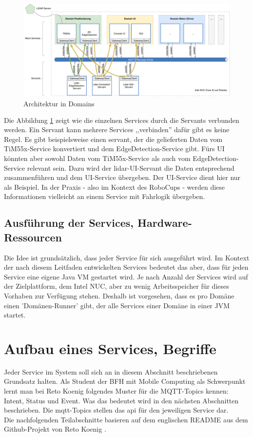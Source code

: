 \begin{figure}[H]
	\centering
	\includegraphics[width=\textwidth]{img/architecture-highlevel.pdf}
	\caption{Architektur in Domains}
	\label{fig:architecture_highlevel}
\end{figure}

Die Abbildung \ref{fig:architecture_highlevel} zeigt wie die einzelnen Services durch die Servants verbunden werden. Ein Servant kann mehrere Services ,,verbinden'' dafür gibt es keine Regel. Es gibt beispielsweise einen \Gls{servant}, der die gelieferten Daten vom TiM55x-Service konvertiert und dem EdgeDetection-Service gibt. Fürs UI könnten aber sowohl Daten vom TiM55x-Service als auch vom EdgeDetection-Service relevant sein. Dazu wird der \acrshort{lidar}-UI-Servant die Daten entsprechend zusammenführen und dem UI-Service übergeben. Der UI-Service dient hier nur als Beispiel. In der Praxis - also im Kontext des RoboCups - werden diese Informationen vielleicht an einem Service mit Fahrlogik übergeben.

\subsection{Ausführung der Services, Hardware-Ressourcen}
Die Idee ist grundsätzlich, dass jeder Service für sich ausgeführt wird. Im Kontext der nach diesem Leitfaden entwickelten Services bedeutet das aber, dass für jeden Service eine eigene Java VM gestartet wird. Je nach Anzahl der Services wird auf der Zielplattform, dem Intel NUC, aber zu wenig Arbeitsspeicher für dieses Vorhaben zur Verfügung stehen. Deshalb ist vorgesehen, dass es pro Domäne einen 'Domänen-Runner' gibt, der alle Services einer Domäne in einer JVM startet.

\section{Aufbau eines Services, Begriffe}
\label{sec:isePattern}
Jeder Service im System soll sich an in diesem Abschnitt beschriebenen Grundsatz halten. Als Student der BFH mit Mobile Computing als Schwerpunkt lernt man bei Reto Koenig folgendes Muster für die MQTT-Topics kennen: Intent, Status und Event. Was das bedeutet wird in den nächsten Abschnitten beschrieben. Die \acrshort{mqtt}-Topics stellen das \acrshort{api} für den jeweiligen Service dar. \\ Die nachfolgenden Teilabschnitte basieren auf dem englischen README aus dem Github-Projekt von Reto Koenig \cite{ch.quantasy.mqtt.gateway}.


